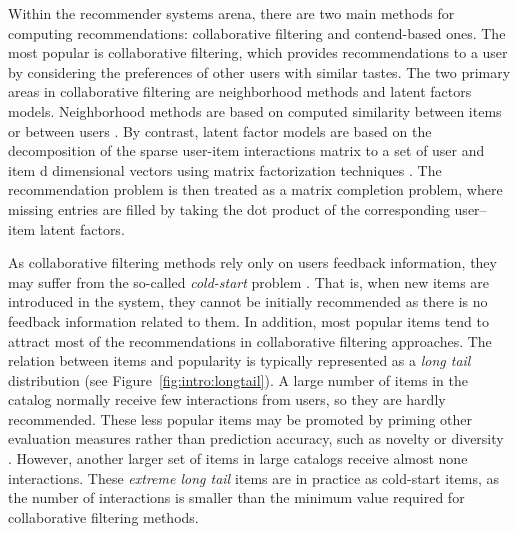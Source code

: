Within the recommender systems arena, there are two main methods for computing recommendations: collaborative filtering and contend-based ones.
The most popular is collaborative filtering, which provides recommendations to a user by considering the preferences of other users with similar tastes. 
The two primary areas in collaborative filtering are neighborhood methods and latent factors models. Neighborhood methods are based on computed similarity between items or between users \cite{Sarwar2001}. By contrast, latent factor models are based on the decomposition of the sparse user-item interactions matrix to a set of user and item d dimensional vectors using matrix factorization techniques \citep{Koren2009}. The recommendation problem is then treated as a matrix completion problem, where missing entries are filled by taking the dot product of the corresponding user–item latent factors. %

As collaborative filtering methods rely only on users feedback information, they may suffer from the so-called \textit{cold-start} problem \citep{Saveski2014}. That is, when new items are introduced in the system, they cannot be initially recommended as there is no feedback information related to them.
In addition, most popular items tend to attract most of the recommendations in collaborative filtering approaches. The relation between items and popularity is typically represented as a \textit{long tail} distribution \citep{anderson2006long} (see Figure~\ref{fig:intro:longtail}). A large number of items in the catalog normally receive few interactions from users, so they are hardly recommended. %
These less popular items may be promoted by priming other evaluation measures rather than prediction accuracy, such as novelty or diversity \citep{abdollahpouri2017controlling}.
However, another larger set of items in large catalogs receive almost none interactions. These \textit{extreme long tail} items are in practice as cold-start items, as the number of interactions is smaller than the minimum value required for collaborative filtering methods.

